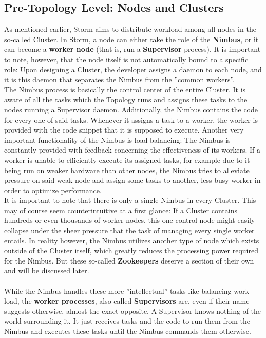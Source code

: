 \documentclass[12pt,a4paper]{article}
\begin{document}
\subsection{Pre-Topology Level: Nodes and Clusters}

As mentioned earlier, Storm aims to distribute workload among all nodes in the so-called Cluster. In Storm, a node can either take the role of the \textbf{Nimbus}, or it can become a \textbf{worker node} (that is, run a \textbf{Supervisor} process). It is important to note, however, that the node itself is not automatically bound to a specific role: Upon designing a Cluster, the developer assigns a daemon to each node, and it is this daemon that separates the Nimbus from the ''common workers''.\\

The Nimbus process is basically the control center of the entire Cluster. It is aware of all the tasks which the Topology runs and assigns these tasks to the nodes running a Supervisor daemon. Additionally, the Nimbus contains the code for every one of said tasks. Whenever it assigns a task to a worker, the worker is provided with the code snippet that it is supposed to execute. Another very important functionality of the Nimbus is load balancing: The Nimbus is constantly provided with feedback concerning the effectiveness of its workers. If a worker is unable to efficiently execute its assigned tasks, for example due to it being run on weaker hardware than other nodes, the Nimbus tries to alleviate pressure on said weak node and assign some tasks to another, less busy worker in order to optimize performance.\\

It is important to note that there is only a single Nimbus in every Cluster. This may of course seem counterintuitive at a first glance: If a Cluster contains hundreds or even thousands of worker nodes, this one control node might easily collapse under the sheer pressure that the task of managing every single worker entails. In reality however, the Nimbus utilizes another type of node which exists outside of the Cluster itself, which greatly reduces the processing power required for the Nimbus. But these so-called \textbf{Zookeepers} deserve a section of their own and will be discussed later.\\\\

While the Nimbus handles these more ''intellectual'' tasks like balancing work load, the \textbf{worker processes}, also called \textbf{Supervisors} are, even if their name suggests otherwise, almost the exact opposite. A Supervisor knows nothing of the world surrounding it. It just receives tasks and the code to run them from the Nimbus and executes these tasks until the Nimbus commands them otherwise.\\
\end{document}
